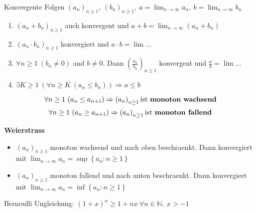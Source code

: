 \documentclass[8pt,a4paper,twocolumn]{extarticle}
\newcommand{\N}{\mathbb{N}}
\newcommand{\seq}[1]{\left( #1_n \right)_{n \ge 1}}
\begin{document}
\begin{satz}{2.8}
    Konvergente Folgen $\seq{a},\ \seq{b},\ a = \lim_{n \to \infty} a_n,\ b = \lim_{n \to \infty} b_n$
    \begin{enumerate}
        \item $(a_n + b_n)_{n \ge 1}$ auch konvergent und $a + b = \lim_{n \to \infty} (a_n + b_n)$
        \item $(a_n \cdot b_n)_{n \ge 1}$ konvergiert und $a \cdot b = \lim \dots$
        \item $\forall n \ge 1\ (b_n \ne 0)$ and $b \ne 0$. Dann $\left(\frac{a_n}{b_n}\right)_{n \ge 1}$ konvergent und $\frac{a}{b} = \lim \dots$
        \item $\exists K \ge 1\ \left(\forall n \ge K\ (a_n \le b_n)\right) \Rightarrow a \le b$
    \end{enumerate}
\end{satz}

\begin{definition}{2.10}
    \[\forall n \ge 1\ (a_n \le a_{n + 1}) \Rightarrow \seq{a} \mbox{ist \textbf{monoton wachsend}}\]
    \[\forall n \ge 1\ (a_n \ge a_{n + 1}) \Rightarrow \seq{a} \mbox{ist \textbf{monoton fallend}}\]
\end{definition}

\begin{satz}{2.11}
    \par \textbf{Weierstrass}
    \begin{itemize}
        \item $\seq{a}$ monoton wachsend und nach oben beschraenkt. Dann konvergiert mit $\lim_{n \to \infty} a_n = \sup \left\{ a_n : n \ge 1 \right\}$
        \item $\seq{a}$ monoton fallend und nach unten beschraenkt. Dann konvergiert mit $\lim_{n \to \infty} a_n = \inf \left\{ a_n : n \ge 1 \right\}$
    \end{itemize}
\end{satz}

\begin{lemma}{}
    Bernoulli Ungleichung: $(1 + x)^n \ge 1 + nx\ \forall n \in \N,\ x > -1$
\end{lemma}
\end{document}
